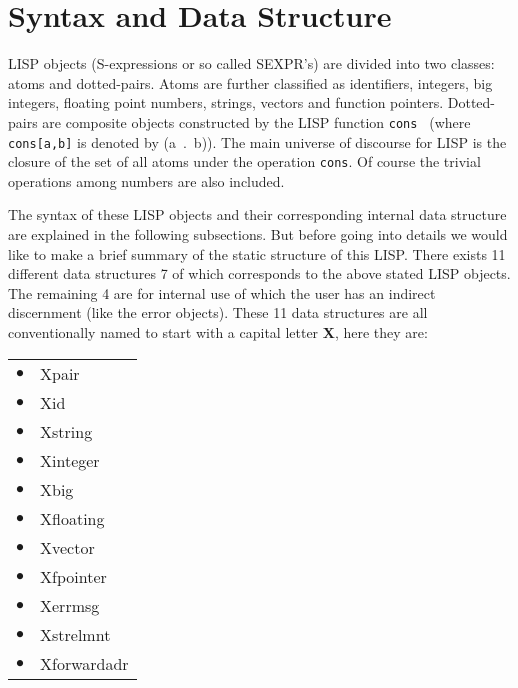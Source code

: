 \setlength{\unitlength}{1ex} %

\chapter{Syntax and Data Structure}
LISP  objects  (S-expressions  or  so  called SEXPR's) are divided into two
classes:  atoms  and  dotted-pairs.  Atoms  are   further   classified   as
identifiers,  integers,  big  integers,  floating  point  numbers, strings,
vectors  and  function  pointers.  Dotted-pairs   are   composite   objects
constructed by  the LISP function {\tt cons } (where \mbox{{\tt cons[a,b]}}
is denoted by \mbox{(a . b)}). The main universe of discourse for  LISP  is
the  closure  of  the  set  of all atoms under the operation {\tt cons}. Of
course the trivial operations among numbers are also included.

The syntax of these LISP objects  and  their  corresponding  internal  data
structure are explained in the following subsections. But before going into
details  we  would  like to make a brief summary of the static structure of
this LISP. There exists 11 different data structures 7 of which corresponds
to the above stated LISP objects. The remaining 4 are for internal  use  of
which the user has an indirect discernment (like the error objects).
These  11  data  structures  are  all  conventionally named to start with a
capital letter {\bf X}, here they are:
\vspace*{5ex}\\ \hspace*{5ex}
\begin{tabular}{rl}
     $\bullet$ &   Xpair       \\
     $\bullet$ &   Xid         \\
     $\bullet$ &   Xstring     \\
     $\bullet$ &   Xinteger    \\
     $\bullet$ &   Xbig        \\
     $\bullet$ &   Xfloating   \\
     $\bullet$ &   Xvector     \\
     $\bullet$ &   Xfpointer   \\
     $\bullet$ &   Xerrmsg     \\
     $\bullet$ &   Xstrelmnt   \\
     $\bullet$ &   Xforwardadr \\

\end{tabular}
\vspace*{5ex}

